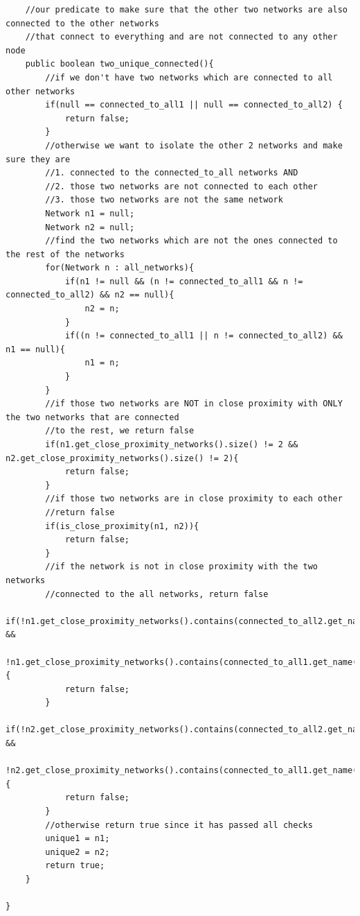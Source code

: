 \documentclass{article}
\begin{document}
\begin{lstlisting}
    //our predicate to make sure that the other two networks are also connected to the other networks
    //that connect to everything and are not connected to any other node
    public boolean two_unique_connected(){
        //if we don't have two networks which are connected to all other networks
        if(null == connected_to_all1 || null == connected_to_all2) {
            return false;
        }
        //otherwise we want to isolate the other 2 networks and make sure they are
        //1. connected to the connected_to_all networks AND
        //2. those two networks are not connected to each other
        //3. those two networks are not the same network
        Network n1 = null;
        Network n2 = null;
        //find the two networks which are not the ones connected to the rest of the networks
        for(Network n : all_networks){
            if(n1 != null && (n != connected_to_all1 && n != connected_to_all2) && n2 == null){
                n2 = n;
            }
            if((n != connected_to_all1 || n != connected_to_all2) && n1 == null){
                n1 = n;
            }
        }
        //if those two networks are NOT in close proximity with ONLY the two networks that are connected
        //to the rest, we return false
        if(n1.get_close_proximity_networks().size() != 2 && n2.get_close_proximity_networks().size() != 2){
            return false;
        }
        //if those two networks are in close proximity to each other
        //return false
        if(is_close_proximity(n1, n2)){
            return false;
        }
        //if the network is not in close proximity with the two networks
        //connected to the all networks, return false
        if(!n1.get_close_proximity_networks().contains(connected_to_all2.get_name()) &&
                !n1.get_close_proximity_networks().contains(connected_to_all1.get_name())){
            return false;
        }
        if(!n2.get_close_proximity_networks().contains(connected_to_all2.get_name()) &&
                !n2.get_close_proximity_networks().contains(connected_to_all1.get_name())) {
            return false;
        }
        //otherwise return true since it has passed all checks
        unique1 = n1;
        unique2 = n2;
        return true;
    }

}
\end{lstlisting}
\end{document}
